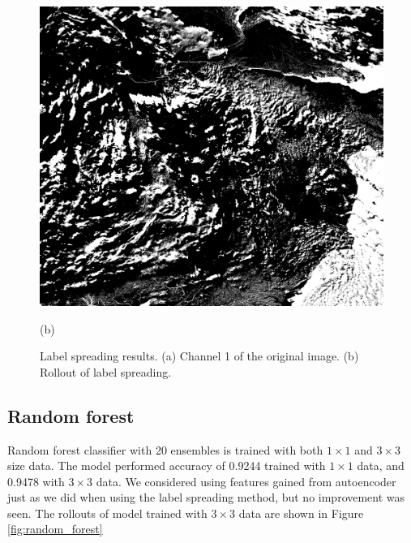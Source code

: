 \documentclass{article}
\begin{document}
\begin{figure}[ht]
\begin{minipage}{0.49\hsize}
                    \includegraphics[width = 1\hsize]{2_label.png}
                    \caption*{(b)}
                \end{minipage}
                \caption{
                    Label spreading results.
                    (a) Channel 1 of the original image.
                    (b) Rollout of label spreading.
                }
                \label{fig:label}
            \end{figure}

    \subsection{Random forest} \label{sec:random}
        Random forest classifier with 20 ensembles is trained with
        both $1\times 1$ and $3\times 3$ size data.
        The model performed accuracy of 0.9244 trained with $1\times 1$ data,
        and 0.9478 with $3\times 3$ data.
        We considered using features gained from autoencoder just as
        we did when using the label spreading method,
        but no improvement was seen.
        The rollouts of model trained with $3\times 3$ data
        are shown in Figure \ref{fig:random_forest}
\end{document}
